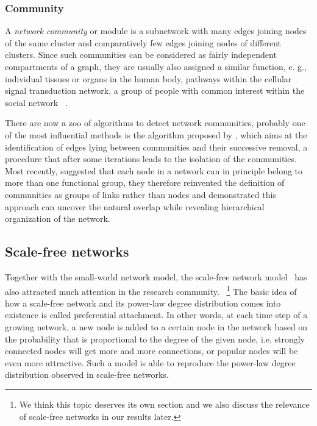 \subsubsection{Community}
A \emph{network community} or module is a subnetwork with many edges joining
nodes of the same cluster and comparatively few edges joining nodes of 
different clusters. Since such communities can be considered as fairly 
independent compartments of a graph, they are usually also assigned 
a similar function, e. g., individual tissues or organs in the human body,
pathways within the cellular signal transduction network, a group of people
with common interest within the social network~%
\citep{Fortunato2010,Newman2012}.

There are now a zoo of algorithms to detect network communities, probably one
of the most influential methods is the algorithm proposed by \cite{Girvan2002},
which aims at the identification of edges lying between communities and their 
successive removal, a procedure that after some iterations
leads to the isolation of the communities. Most recently, \cite{Ahn2010b} 
suggested that each node in a network can in principle belong to more than 
one functional group, they therefore reinvented the definition of communities 
as groups of links rather than nodes and demonstrated this approach can uncover
the natural overlap while revealing hierarchical organization of the network.

\subsection{Scale-free networks}
\label{sec:scale_free}
Together with the small-world network model, the scale-free network model~%
\citep{Barabasi1999} has
also attracted much attention in the research community.~%
\footnote{We think this topic deserves its own section and we also discuss
the relevance of scale-free networks in our results later.}
The basic idea of 
how a scale-free network and its power-law degree distribution comes into
existence is called preferential attachment. In other words, at each time
step of a growing network, a new node is added to a certain node in the 
network based on the probability that is proportional to the degree of the
given node, i.e. strongly connected nodes will get more and more connections, or
popular nodes will be even more attractive. Such a model is able to reproduce
the power-law degree distribution observed in scale-free networks.

